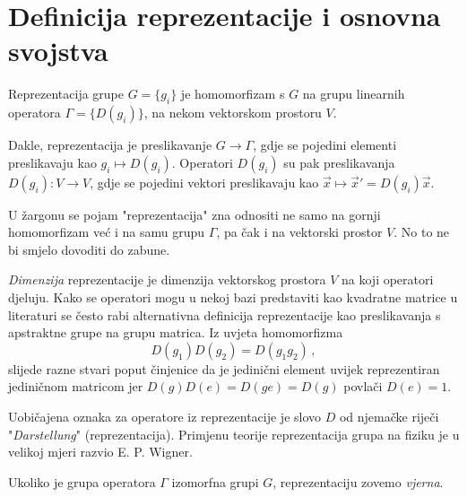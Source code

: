 \section{Definicija reprezentacije i osnovna svojstva}
\label{sec:reprezentacije}

\begin{definicija} 
Reprezentacija grupe $G=\{g_{i}\}$ je homomorfizam s $G$ na
grupu linearnih operatora
$\Gamma=\{D(g_{i})\}$, na nekom vektorskom prostoru $V$.
\end{definicija}

Dakle, reprezentacija je preslikavanje $G \to \Gamma$, gdje
se pojedini elementi preslikavaju kao $g_{i} \mapsto D(g_i)$.
Operatori $D(g_i)$ su pak preslikavanja $D(g_i):V \to V$, gdje
se pojedini vektori preslikavaju kao $\vec{x} \mapsto \vec{x}' = D(g_i) \vec{x}$.

U žargonu se pojam "reprezentacija" zna odnositi ne samo na
gornji homomorfizam već i na samu grupu $\Gamma$, pa čak i na vektorski
prostor $V$. No to ne bi smjelo dovoditi do zabune.

\emph{Dimenzija} reprezentacije je dimenzija vektorskog prostora $V$ na koji operatori djeluju.
Kako se  operatori mogu u nekoj bazi predstaviti kao kvadratne matrice u literaturi
 se često rabi alternativna definicija reprezentacije kao preslikavanja s
 apstraktne grupe na grupu matrica.
Iz uvjeta homomorfizma
\begin{displaymath}
           D(g_1) D(g_2) = D(g_1 g_2) \,,
\end{displaymath}
slijede razne stvari poput činjenice da je jedinični element uvijek reprezentiran
jediničnom matricom jer $D(g)D(e)=D(ge)=D(g)$ povlači $D(e)=1$.

Uobičajena oznaka za operatore iz reprezentacije je slovo $D$ od
njemačke riječi "\emph{Darstellung}" (reprezentacija). Primjenu teorije reprezentacija
  grupa na fiziku je u velikoj mjeri razvio E. P. Wigner.

Ukoliko je grupa operatora $\Gamma$ izomorfna grupi $G$, 
  reprezentaciju zovemo \emph{vjerna}.

